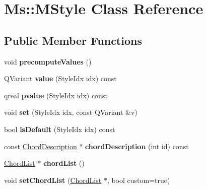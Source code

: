 \hypertarget{class_ms_1_1_m_style}{}\section{Ms\+:\+:M\+Style Class Reference}
\label{class_ms_1_1_m_style}
\subsection*{Public Member Functions}
\begin{DoxyCompactItemize}
\item 
\mbox{\label{class_ms_1_1_m_style_a8c7b81e2a33a641e3caa50b79661ba33}} 
void {\bfseries precompute\+Values} ()
\item 
\mbox{\label{class_ms_1_1_m_style_a63605db226e0da59e4192e48de4f060a}} 
Q\+Variant {\bfseries value} (Style\+Idx idx) const
\item 
\mbox{\label{class_ms_1_1_m_style_a067ea86abc747758a72a00943f6e6d2d}} 
qreal {\bfseries pvalue} (Style\+Idx idx) const
\item 
\mbox{\label{class_ms_1_1_m_style_ae442d66f110c9abc578ad0aa14c1def9}} 
void {\bfseries set} (Style\+Idx idx, const Q\+Variant \&v)
\item 
\mbox{\label{class_ms_1_1_m_style_a7571212b1d5b2ed018262c66bf1ee030}} 
bool {\bfseries is\+Default} (Style\+Idx idx) const
\item 
\mbox{\label{class_ms_1_1_m_style_aef94465bcce4c922f843e6a035749502}} 
const \hyperlink{struct_ms_1_1_chord_description}{Chord\+Description} $\ast$ {\bfseries chord\+Description} (int id) const
\item 
\mbox{\label{class_ms_1_1_m_style_a5b4978e1e82d82629e42847aef9159d7}} 
\hyperlink{class_ms_1_1_chord_list}{Chord\+List} $\ast$ {\bfseries chord\+List} ()
\item 
\mbox{\label{class_ms_1_1_m_style_ab2eb4a85f31f93a984220e30a555a561}} 
void {\bfseries set\+Chord\+List} (\hyperlink{class_ms_1_1_chord_list}{Chord\+List} $\ast$, bool custom=true)

\end{DoxyCompactItemize}
